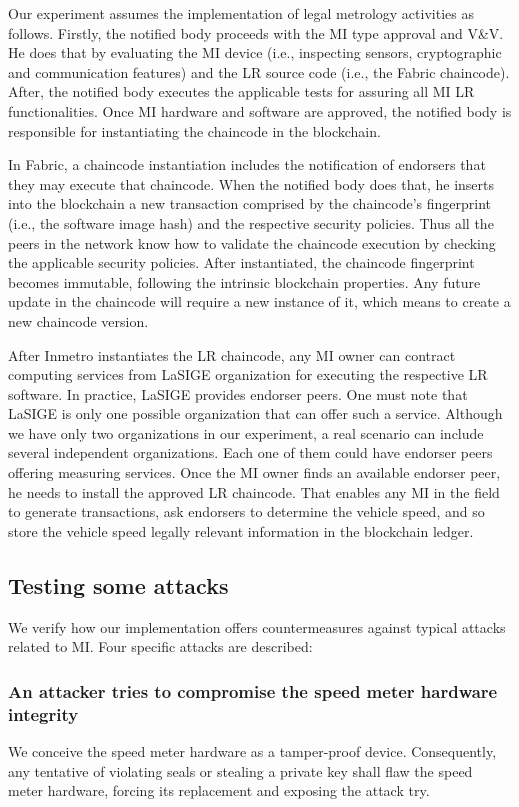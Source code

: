 \documentclass[journal]{IEEEtran}
\begin{document}
Our experiment assumes the implementation of legal metrology activities as follows.
Firstly, the notified body proceeds with the MI type approval and V\&V.
He does that by evaluating the MI device (i.e., inspecting sensors, cryptographic and communication features) and the LR source code (i.e., the Fabric chaincode).
After,  the notified body executes the applicable tests for assuring all MI LR functionalities.
Once MI hardware and software are approved, the notified body is responsible for instantiating the chaincode in the blockchain.

In Fabric, a chaincode instantiation includes the notification of endorsers that they may execute that chaincode.
When the notified body does that, he inserts into the blockchain a new transaction comprised by the chaincode's fingerprint (i.e., the software image hash) and the respective security policies.
Thus all the peers in the network know how to validate the chaincode execution by checking the applicable security policies.
After instantiated, the chaincode fingerprint becomes immutable, following the intrinsic blockchain properties.
Any future update in the chaincode will require a new instance of it, which means to create a new chaincode version.

After Inmetro instantiates the LR chaincode, any MI owner can contract computing services from LaSIGE organization for executing the respective LR software.
In practice, LaSIGE provides endorser peers.
One must note that LaSIGE is only one possible organization that can offer such a service.
Although we have only two organizations in our experiment, a real scenario can include several independent organizations.
Each one of them could have endorser peers offering measuring services.
Once the MI owner finds an available endorser peer, he needs to install the approved LR chaincode.
That enables any MI in the field to generate transactions, ask endorsers to determine the vehicle speed, and so store the vehicle speed legally relevant information in the blockchain ledger.

\subsection{Testing some attacks}

We verify how our implementation offers countermeasures against typical attacks related to MI.
Four specific attacks are described:
\subsubsection{An attacker tries to compromise the speed meter hardware integrity}
We conceive the speed meter hardware as a tamper-proof device.
Consequently, any tentative of violating seals or stealing a private key shall flaw the speed meter hardware, forcing its replacement and exposing the attack try.
\end{document}
